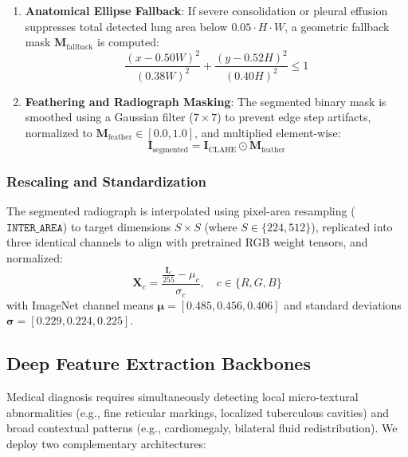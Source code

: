 \documentclass[journal]{IEEEtran}
\begin{document}
\begin{enumerate}
    \item \textbf{Anatomical Ellipse Fallback}: If severe consolidation or pleural effusion suppresses total detected lung area below $0.05 \cdot H \cdot W$, a geometric fallback mask $\mathbf{M}_{\text{fallback}}$ is computed:
    \begin{equation}
    \frac{(x - 0.50W)^2}{(0.38W)^2} + \frac{(y - 0.52H)^2}{(0.40H)^2} \le 1
    \end{equation}
    \item \textbf{Feathering and Radiograph Masking}: The segmented binary mask is smoothed using a Gaussian filter ($7 \times 7$) to prevent edge step artifacts, normalized to $\mathbf{M}_{\text{feather}} \in [0.0, 1.0]$, and multiplied element-wise:
    \begin{equation}
    \mathbf{I}_{\text{segmented}} = \mathbf{I}_{\text{CLAHE}} \odot \mathbf{M}_{\text{feather}}
    \end{equation}
\end{enumerate}

\subsubsection{Rescaling and Standardization}
The segmented radiograph is interpolated using pixel-area resampling ($\texttt{INTER\_AREA}$) to target dimensions $S \times S$ (where $S \in \{224, 512\}$), replicated into three identical channels to align with pretrained RGB weight tensors, and normalized:
\begin{equation}
\mathbf{X}_c = \frac{\frac{\mathbf{I}_c}{255} - \mu_c}{\sigma_c}, \quad c \in \{R, G, B\}
\label{eq:imagenet_norm}
\end{equation}
with ImageNet channel means $\boldsymbol{\mu} = [0.485, 0.456, 0.406]$ and standard deviations $\boldsymbol{\sigma} = [0.229, 0.224, 0.225]$.

\subsection{Deep Feature Extraction Backbones}
\label{subsec:backbones}

Medical diagnosis requires simultaneously detecting local micro-textural abnormalities (e.g., fine reticular markings, localized tuberculous cavities) and broad contextual patterns (e.g., cardiomegaly, bilateral fluid redistribution). We deploy two complementary architectures:
\end{document}
